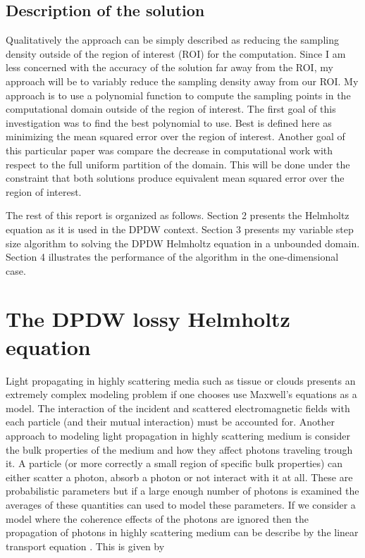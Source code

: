 \documentclass [11 pt, titlepage]{article}
\begin{document}
\subsection {Description of the solution}
\vspace {-4ex}
Qualitatively the approach can be simply described as reducing the
sampling density outside of the region of interest (ROI) for the
computation.  Since I am less concerned with the accuracy of the
solution far away from the ROI, my approach will be to variably reduce
the sampling density away from our ROI. My approach is to use a
polynomial function to compute the sampling points in the computational domain
outside of the region of interest. The first goal of this
investigation was to find the best polynomial to use.  Best is defined
here as minimizing the mean squared error over the region of interest.
Another goal of this particular paper was compare the decrease in
computational work with respect to the full uniform partition of the
domain.  This will be done under the constraint that both solutions
produce equivalent mean squared error over the region of interest.

The rest of this report is organized as follows.  Section 2 presents
the Helmholtz equation as it is used in the DPDW context.  Section 3
presents my variable step size algorithm to solving the DPDW Helmholtz
equation in a unbounded domain.  Section 4 illustrates the performance
of the algorithm in the one-dimensional case.

\section {The DPDW lossy Helmholtz equation}
\vspace {-4ex}
Light propagating in highly scattering media such as tissue or clouds
presents an extremely complex modeling problem if one chooses use
Maxwell's equations as a model.  The interaction of the incident and
scattered electromagnetic fields with each particle (and their mutual
interaction) must be accounted for.  Another approach to modeling
light propagation in highly scattering medium is consider the bulk
properties of the medium and how they affect photons traveling trough
it.  A particle (or more correctly a small region of specific bulk
properties) can either scatter a photon, absorb a photon or not
interact with it at all.  These are probabilistic parameters but if a
large enough number of photons is examined the averages of these
quantities can used to model these parameters.  If we consider a model
where the coherence effects of the photons are ignored then the
propagation of photons in highly scattering medium can be describe by
the linear transport equation \cite{Case:67}.  This is
given by
\end{document}
